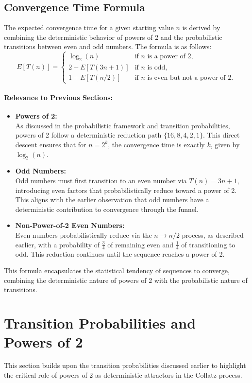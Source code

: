 \subsection{Convergence Time Formula}
The expected convergence time for a given starting value \( n \) is derived by combining the deterministic behavior of powers of 2 and the probabilistic transitions between even and odd numbers. The formula is as follows:
\[
E[T(n)] = 
\begin{cases} 
\log_2(n) & \text{if } n \text{ is a power of 2}, \\
2 + E[T(3n+1)] & \text{if } n \text{ is odd}, \\
1 + E[T(n/2)] & \text{if } n \text{ is even but not a power of 2}.
\end{cases}
\]

\paragraph{Relevance to Previous Sections:}
\begin{itemize}
    \item \textbf{Powers of 2:}\\ As discussed in the probabilistic framework and transition probabilities, powers of 2 follow a deterministic reduction path \( \{16, 8, 4, 2, 1\} \). This direct descent ensures that for \( n = 2^k \), the convergence time is exactly \( k \), given by \( \log_2(n) \).
    \item \textbf{Odd Numbers:}\\ Odd numbers must first transition to an even number via \( T(n) = 3n+1 \), introducing even factors that probabilistically reduce toward a power of 2. This aligns with the earlier observation that odd numbers have a deterministic contribution to convergence through the funnel.
    \item \textbf{Non-Power-of-2 Even Numbers:}\\ Even numbers probabilistically reduce via the \( n \to n/2 \) process, as described earlier, with a probability of \( \frac{3}{4} \) of remaining even and \( \frac{1}{4} \) of transitioning to odd. This reduction continues until the sequence reaches a power of 2.
\end{itemize}

This formula encapsulates the statistical tendency of sequences to converge, combining the deterministic nature of powers of 2 with the probabilistic nature of transitions.

\section{Transition Probabilities and Powers of 2}
This section builds upon the transition probabilities discussed earlier to highlight the critical role of powers of 2 as deterministic attractors in the Collatz process.

